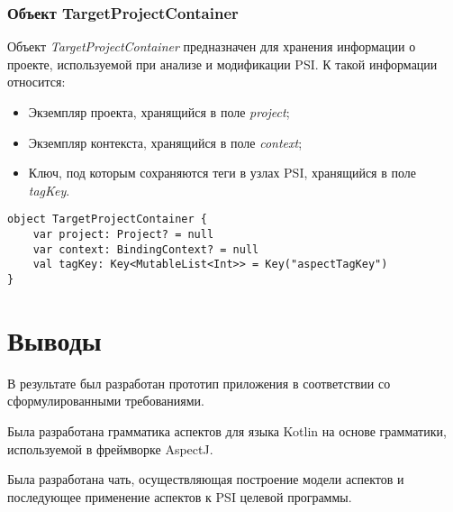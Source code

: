 \subsubsection{Объект TargetProjectContainer}
\label{ssub:TargetProjectContainer}
Объект \textit{TargetProjectContainer} предназначен для хранения информации о проекте, используемой при анализе и модификации PSI.
К такой информации относится:
\begin{itemize}
	\item Экземпляр проекта, хранящийся в поле \textit{project};
	\item Экземпляр контекста, хранящийся в поле \textit{context};
	\item Ключ, под которым сохраняются теги в узлах PSI, хранящийся в поле \textit{tagKey}.
\end{itemize}
\begin{lstlisting}[style={java}, label={lst:TargetProjectContainer},
  caption={Объект TargetProjectContainer}]
object TargetProjectContainer {
    var project: Project? = null
    var context: BindingContext? = null
    val tagKey: Key<MutableList<Int>> = Key("aspectTagKey")
}
\end{lstlisting}
\section{Выводы}
\label{sec:development_conclusion}
В результате был разработан прототип приложения в соответствии со сформулированными требованиями.

Была разработана грамматика аспектов для языка Kotlin на основе грамматики,
используемой в фреймворке AspectJ.

Была разработана чать, осуществляющая построение модели аспектов и последующее
применение аспектов к PSI целевой программы.
